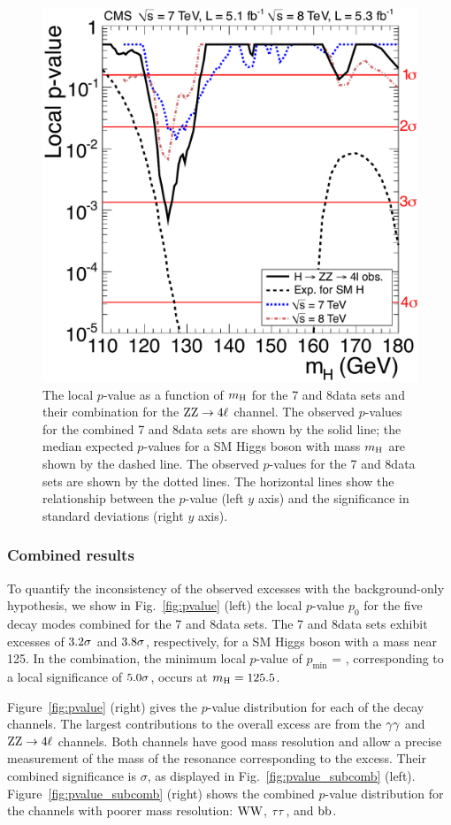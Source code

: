 \documentclass[11pt,twoside,a4paper,cmspaper,final,collab]{cms-tdr}
\begin{document}
\begin{figure}[htbp]
  \begin{center}
    \includegraphics[width=0.49\linewidth]{figures/HZZ_pValue_small}
    \caption{The local $p$-value as a function of $m_{\mathrm{H}}$ for the 7 and 8\TeV data sets and their combination
     for the $\mathrm{Z}\mathrm{Z} \to 4\ell$ channel.
     The observed $p$-values  for the combined 7 and 8\TeV data sets are shown by the solid line;
     the median expected $p$-values for a SM Higgs boson with mass $m_{\mathrm{H}}$ are shown by the dashed line.
     The observed $p$-values for the 7 and 8\TeV data sets are shown by the dotted lines.
     The horizontal lines show the relationship between the $p$-value (left $y$ axis) and
     the significance in standard deviations (right $y$ axis).
     }
   \label{fig:PValue}
  \end{center}
\end{figure}



\subsubsection{Combined results}


To quantify the inconsistency of the observed excesses with the background-only hypothesis,
we show in Fig.~\ref{fig:pvalue} (left) the
local $p$-value $p_0$ for the five decay modes combined for the 7 and 8\TeV data sets.
The 7 and 8\TeV data sets
exhibit excesses of $3.2 \sigma$ and ${\relax3.8}  \sigma$, respectively,
for a SM Higgs boson with a mass near {\color{black}125}\GeV.
In the combination, the minimum local $p$-value of $p_{\min}$ = \MinLocalP ,
corresponding to a local significance of ${\relax5.0}  \sigma$, occurs at $m_{\mathrm{H}} = 125.5$\GeV.

Figure~\ref{fig:pvalue} (right) gives the $p$-value distribution for each of the
decay channels. The largest contributions to the overall excess
are from the  $\gamma\gamma$ and $\mathrm{Z}\mathrm{Z} \to 4\ell$ channels. Both channels have good
mass resolution and allow a precise measurement of the mass of
the resonance corresponding to the excess. Their combined
significance is \ZhighRes$\sigma$, as displayed in Fig.~\ref{fig:pvalue_subcomb} (left).
Figure~\ref{fig:pvalue_subcomb} (right) shows the combined $p$-value distribution for the channels
with poorer mass resolution: $\mathrm{W}\mathrm{W}$, $\tau\tau$, and $\mathrm{b}\mathrm{b}$.
\end{document}
